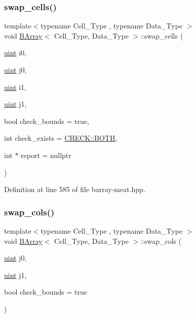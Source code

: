 \subsubsection{\texorpdfstring{swap\+\_\+cells()}{swap\_cells()}}
{\footnotesize\ttfamily template$<$typename Cell\+\_\+\+Type , typename Data\+\_\+\+Type $>$ \\
void \hyperlink{class_b_array}{B\+Array}$<$ Cell\+\_\+\+Type, Data\+\_\+\+Type $>$\+::swap\+\_\+cells (\begin{DoxyParamCaption}\item[{\hyperlink{typedefs_8hpp_a91ad9478d81a7aaf2593e8d9c3d06a14}{uint}}]{i0,  }\item[{\hyperlink{typedefs_8hpp_a91ad9478d81a7aaf2593e8d9c3d06a14}{uint}}]{j0,  }\item[{\hyperlink{typedefs_8hpp_a91ad9478d81a7aaf2593e8d9c3d06a14}{uint}}]{i1,  }\item[{\hyperlink{typedefs_8hpp_a91ad9478d81a7aaf2593e8d9c3d06a14}{uint}}]{j1,  }\item[{bool}]{check\+\_\+bounds = {\ttfamily true},  }\item[{int}]{check\+\_\+exists = {\ttfamily \hyperlink{namespace_c_h_e_c_k_a3acda1c74bfabb5b6b67e19d0ad2d52a}{C\+H\+E\+C\+K\+::\+B\+O\+TH}},  }\item[{int $\ast$}]{report = {\ttfamily nullptr} }\end{DoxyParamCaption})\hspace{0.3cm}{\ttfamily [inline]}}



Definition at line 585 of file barray-\/meat.\+hpp.

\mbox{\label{class_b_array_ae94f7e61ca5985244968d9daf2859229}} 
\subsubsection{\texorpdfstring{swap\+\_\+cols()}{swap\_cols()}}
{\footnotesize\ttfamily template$<$typename Cell\+\_\+\+Type , typename Data\+\_\+\+Type $>$ \\
void \hyperlink{class_b_array}{B\+Array}$<$ Cell\+\_\+\+Type, Data\+\_\+\+Type $>$\+::swap\+\_\+cols (\begin{DoxyParamCaption}\item[{\hyperlink{typedefs_8hpp_a91ad9478d81a7aaf2593e8d9c3d06a14}{uint}}]{j0,  }\item[{\hyperlink{typedefs_8hpp_a91ad9478d81a7aaf2593e8d9c3d06a14}{uint}}]{j1,  }\item[{bool}]{check\+\_\+bounds = {\ttfamily true} }\end{DoxyParamCaption})\hspace{0.3cm}{\ttfamily [inline]}}



